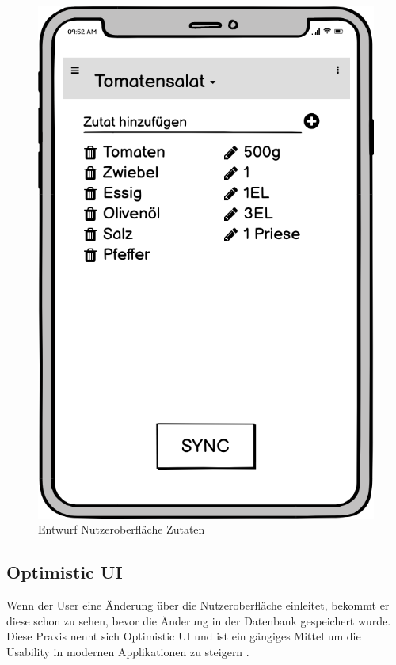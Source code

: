 \documentclass[a4paper, 12pt]{scrreprt}
\begin{document}
\begin{figure}[H]
\begin{minipage}{.45\textwidth}
		\includegraphics[width=1\textwidth]{wireframeZutaten2.png}
		\caption{Entwurf Nutzeroberfläche Zutaten}
		\label{fig:zutatenFrame}
	\end{minipage}
\end{figure}

\subsection{Optimistic UI}
\label{sec:optimisticUI}
Wenn der User eine Änderung über die Nutzeroberfläche einleitet, bekommt er diese schon zu sehen, bevor die Änderung in der Datenbank gespeichert wurde. Diese Praxis nennt sich Optimistic UI und ist ein gängiges Mittel um die Usability in modernen Applikationen zu steigern \autocite{ArticleOptimisticUI}.
\end{document}
